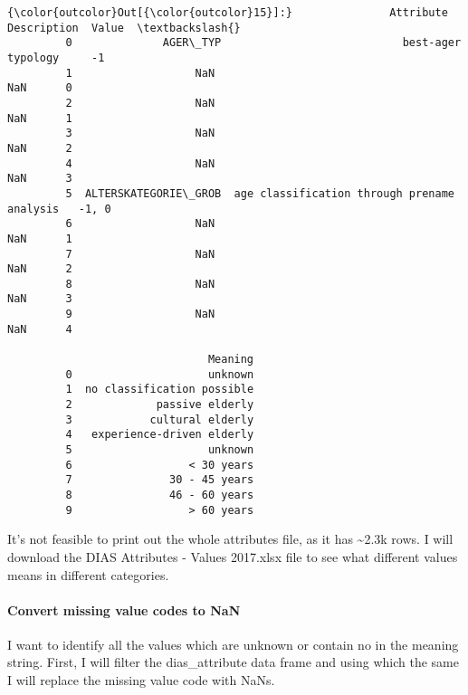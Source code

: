 \documentclass[11pt]{article}
\begin{document}
\begin{Verbatim}[commandchars=\\\{\}]
{\color{outcolor}Out[{\color{outcolor}15}]:}               Attribute                                   Description  Value  \textbackslash{}
         0              AGER\_TYP                            best-ager typology     -1   
         1                   NaN                                           NaN      0   
         2                   NaN                                           NaN      1   
         3                   NaN                                           NaN      2   
         4                   NaN                                           NaN      3   
         5  ALTERSKATEGORIE\_GROB  age classification through prename analysis   -1, 0   
         6                   NaN                                           NaN      1   
         7                   NaN                                           NaN      2   
         8                   NaN                                           NaN      3   
         9                   NaN                                           NaN      4   
         
                               Meaning  
         0                     unknown  
         1  no classification possible  
         2             passive elderly  
         3            cultural elderly  
         4   experience-driven elderly  
         5                     unknown  
         6                  < 30 years  
         7               30 - 45 years  
         8               46 - 60 years  
         9                  > 60 years  
\end{Verbatim}
            
    It's not feasible to print out the whole attributes file, as it has
\textasciitilde{}2.3k rows. I will download the DIAS Attributes - Values
2017.xlsx file to see what different values means in different
categories.

    \paragraph{Convert missing value codes to
NaN}\label{convert-missing-value-codes-to-nan}

    I want to identify all the values which are unknown or contain no in the
meaning string. First, I will filter the dias\_attribute data frame and
using which the same I will replace the missing value code with NaNs.
\end{document}
